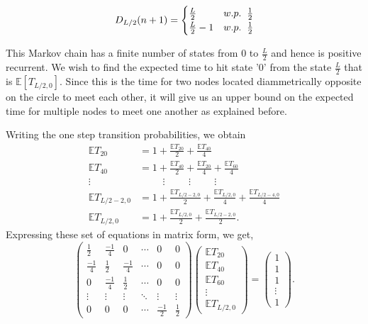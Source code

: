\documentclass[a4paper,10pt,english]{article}
\begin{document}
\begin{equation}
D_{L/2}(n+1)=
\begin{cases}
\frac{L}{2} & w.p. \hspace{0.2cm} \frac{1}{2}\\
\frac{L}{2}-1 & w.p. \hspace{0.2cm} \frac{1}{2}
\end{cases}
\end{equation}
\par This Markov chain has a finite number of states from 0 to $\frac{L}{2}$ and hence is positive recurrent. We wish to find the expected time to hit state '0' from the state $\frac{L}{2}$ that is $\mathbb{E}[T_{L/2,0}]$. Since this is the time for two nodes located diammetrically opposite on the circle to meet each other, it will give us an upper bound on the expected time for multiple nodes to meet one another as explained before.
\par Writing the one step transition probabilities, we obtain 
\begin{align*}
	\mathbb{E}T_{20}&=1+\frac{\mathbb{E}T_{20}}{2}+\frac{\mathbb{E}T_{40}}{4}\\
	\mathbb{E}T_{40}&=1+\frac{\mathbb{E}T_{40}}{2}+\frac{\mathbb{E}T_{20}}{4}+\frac{\mathbb{E}T_{60}}{4}\\
	\vdots & \hspace{1cm}\vdots  \hspace{1cm}\vdots \hspace{1cm}\vdots\\
	\mathbb{E}T_{L/2-2,0}&=1+\frac{\mathbb{E}T_{L/2-2,0}}{2}+\frac{\mathbb{E}T_{L/2,0}}{4}+\frac{\mathbb{E}T_{L/2-4,0}}{4}\\
	\mathbb{E}T_{L/2,0}&=1+\frac{\mathbb{E}T_{L/2,0}}{2}+\frac{\mathbb{E}T_{L/2-2,0}}{2}.
\end{align*}
Expressing these set of equations in matrix form, we get,
\begin{equation}
\begin{pmatrix}
\frac{1}{2} & \frac{-1}{4} & 0 & \cdots & 0 & 0\\
\frac{-1}{4} & \frac{1}{2} & \frac{-1}{4} & \cdots & 0  & 0\\
0 &\frac{-1}{4} & \frac{1}{2} & \cdots & 0 & 0\\
\vdots  & \vdots & \vdots & \ddots & \vdots & \vdots \\
0 & 0 & 0 & \cdots & \frac{-1}{2} & \frac{1}{2} 
\end{pmatrix}
\begin{pmatrix}
\mathbb{E}T_{20}\\
\mathbb{E}T_{40}\\
\mathbb{E}T_{60}\\
\vdots\\
\mathbb{E}T_{L/2,0}
\end{pmatrix}
=
\begin{pmatrix}
1\\
1\\
1\\
\vdots\\
1
\end{pmatrix}.
\end{equation}
\end{document}
